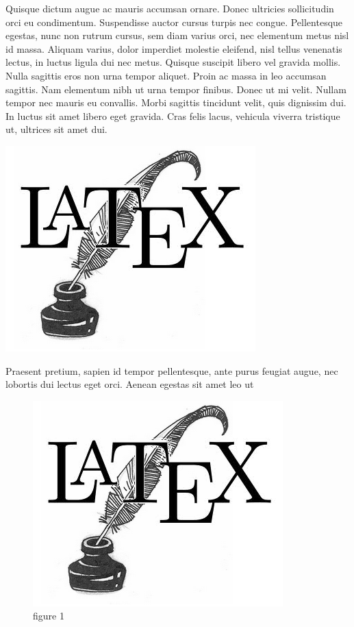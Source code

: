 \documentclass[letterpaper,12pt]{book}
\begin{document}
	Quisque dictum augue ac mauris accumsan ornare. Donec ultricies sollicitudin orci eu condimentum. Suspendisse auctor cursus turpis nec congue. Pellentesque egestas, nunc non rutrum cursus, sem diam varius orci, nec elementum metus nisl id massa. Aliquam varius, dolor imperdiet molestie eleifend, nisl tellus venenatis lectus, in luctus ligula dui nec metus. Quisque suscipit libero vel gravida mollis. Nulla sagittis eros non urna tempor aliquet. Proin ac massa in leo accumsan sagittis. Nam elementum nibh ut urna tempor finibus. Donec \hspace{6cm} ut mi velit. Nullam tempor nec mauris  eu convallis. Morbi sagittis tincidunt velit, quis dignissim dui. In luctus sit amet libero eget gravida. Cras felis lacus, vehicula viverra tristique ut, ultrices sit amet dui.
	
	\includegraphics[scale=0.5]{./pics/logo.png}
	
	Praesent pretium, sapien id tempor pellentesque, ante purus feugiat augue, nec lobortis dui lectus eget orci. Aenean egestas sit amet leo ut 
	\begin{figure}[h]
		\centering
		\includegraphics[scale=0.5]{./pics/logo.png}
		\caption{figure 1}
	\end{figure}
\end{document}

